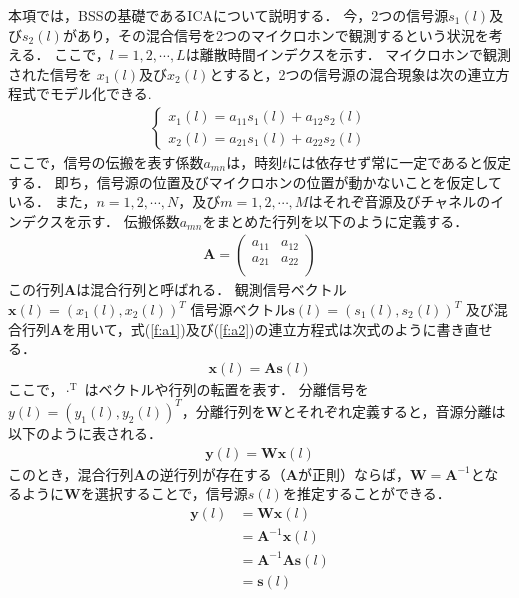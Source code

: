 本項では，BSSの基礎であるICAについて説明する．
今，2つの信号源$s_1(l)$及び$s_2(l)$があり，その混合信号を2つのマイクロホンで観測するという状況を考える．
ここで，$l = 1, 2, \cdots , L$は離散時間インデクスを示す．
マイクロホンで観測された信号を
$x_1(l)$及び$x_2(l)$とすると，2つの信号源の混合現象は次の連立方程式でモデル化できる.
\begin{eqnarray}
  \begin{cases}
    x_1(l) = a_{11}s_1(l) + a_{12}s_2(l)  \label{f:a1}\\
    x_2(l) = a_{21}s_1(l) + a_{22}s_2(l)  \label{f:a2}
  \end{cases}
\end{eqnarray}
ここで，信号の伝搬を表す係数$a_{mn}$は，時刻$t$には依存せず常に一定であると仮定する．
即ち，信号源の位置及びマイクロホンの位置が動かないことを仮定している．
また，$n = 1, 2, \cdots , N$，及び$m =
1, 2, \cdots , M $はそれぞ音源及びチャネルのインデクスを示す．
伝搬係数$a_{mn}$をまとめた行列を以下のように定義する．
\begin{align}
    \bm{A} = \begin{pmatrix}
    a_{11}  & a_{12}  \\
    a_{21}  & a_{22}  \\
    \end{pmatrix}
\end{align}
この行列$\bm{A}$は混合行列と呼ばれる．
観測信号ベクトル$\bm{x}(l) = (x_1(l),x_2(l))^T$
信号源ベクトル$\bm{s}(l) = (s_1(l),s_2(l))^T$
及び混合行列$\bm{A}$を用いて，式(\ref{f:a1})及び(\ref{f:a2})の連立方程式は次式のように書き直せる．
\begin{align}
    \bm{x}(l) = \bm{A}\bm{s}(l)　\label{f:x}
\end{align}
ここで，$\cdot^\mathrm{T}$ はベクトルや行列の転置を表す．
分離信号を$y(l) = (y_1(l),y_2(l))^T$，分離行列を$\bm{W}$とそれぞれ定義すると，音源分離は以下のように表される．
\begin{align}
    \bm{y}(l) = \bm{W}\bm{x}(l)
\end{align}
このとき，混合行列$\bm{A}$の逆行列が存在する（$\bm{A}$が正則）ならば，$\bm{W}=\bm{A}^{-1}$となるように$\bm{W}$を選択することで，信号源$s(l)$を推定することができる．
\begin{align}
    \bm{y}(l) &= \bm{W}\bm{x}(l)\\
    &= \bm{A}^{-1}\bm{x}(l)\\
    &= \bm{A}^{-1}\bm{A}\bm{s}(l)\\
    &= \bm{s}(l)
\end{align}

